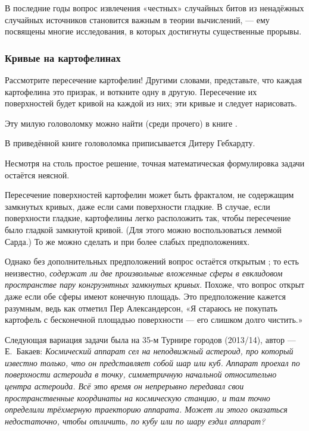 В последние годы вопрос извлечения «честных» %
случайных битов из ненадёжных случайных источников становится важным в теории вычислений, --- ему посвящены многие исследования, в которых достигнуты существенные прорывы.

\subsubsection*{Кривые на картофелинах}

{\sloppy

Рассмотрите пересечение картофелин!
Другими словами, представьте, что каждая картофелина это призрак, и воткните одну в другую.
Пересечение их поверхностей будет кривой на каждой из них; эти кривые и следует нарисовать.

}

Эту милую головоломку можно найти (среди прочего) в книге \cite{5}.

\begin{addedbytheeditors}
В приведённой книге головоломка приписывается Дитеру Гебхардту.

Несмотря на столь простое решение, точная математическая формулировка задачи остаётся неясной.

Пересечение поверхностей картофелин может быть фракталом, не содержащим замкнутых кривых, даже если сами поверхности гладкие.
В случае, если поверхности гладкие, картофелины легко расположить так, чтобы пересечение было гладкой замкнутой кривой.
(Для этого можно воспользоваться леммой Сарда.)
То же можно сделать и при более слабых предположениях.

Однако без дополнительных предположений вопрос остаётся открытым \cite{agol};
то есть неизвестно, \emph{содержат ли две произвольные вложенные сферы в евклидовом пространстве пару конгруэнтных замкнутых кривых}. 
Похоже, что вопрос открыт даже если обе сферы имеют конечную площадь.
Это предположение кажется разумным, ведь как отметил Пер Александерсон,
«Я стараюсь не покупать картофель с бесконечной площадью поверхности --- его слишком долго чистить.»

Следующая вариация задачи была на 35-м Турнире городов (2013/14), автор --- Е.~Бакаев:  \textit{Космический аппарат сел на неподвижный астероид, про который известно только, что он представляет собой шар или куб. Аппарат проехал по поверхности астероида в точку, симметричную начальной относительно центра астероида. Всё это время он непрерывно передавал свои пространственные координаты на космическую станцию, и там точно определили трёхмерную траекторию аппарата. Может ли этого оказаться недостаточно, чтобы отличить, по кубу или по шару ездил аппарат?}
\pr
\end{addedbytheeditors}

